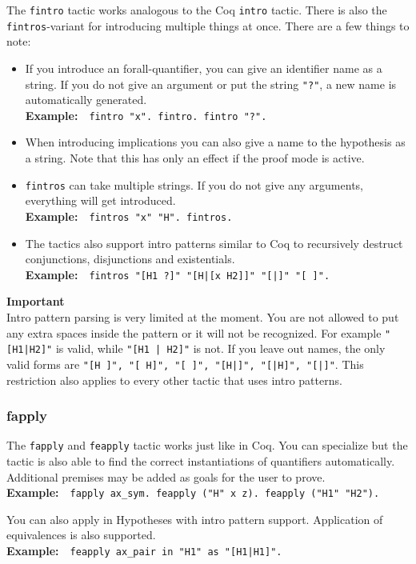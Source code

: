 \documentclass[12pt, a4paper]{article}
\newcommand{\coq}[1]{\texttt{#1}}
\newcommand{\important}[1]{
	\vspace{3pt}
	\begin{boximportant}
		\parbox{\textwidth}{\textcolor{colorimportant}{\textbf{Important}\\#1}}
	\end{boximportant}}
\newcommand{\example}[1]{\medskip\\\textbf{Example:}~~#1}
\begin{document}
The \texttt{fintro} tactic works analogous to the Coq \texttt{intro} tactic. 
There is also the \texttt{fintros}-variant for introducing multiple things at once. 
There are a few things to note:
\begin{itemize}
	\item 
	If you introduce an forall-quantifier, you can give an identifier name as a string. 
	If you do not give an argument or put the string \coq{"?"}, a new name is automatically generated.
	\example{\coq{fintro "x". fintro. fintro "?".}}
	
	\item
	When introducing implications you can also give a name to the hypothesis as a string. 
	Note that this has only an effect if the proof mode is active.
	
	\item 
	\texttt{fintros} can take multiple strings. 
	If you do not give any arguments, everything will get introduced.
	\example{\coq{fintros "x" "H". fintros.}}
	
	\item
	The tactics also support intro patterns similar to Coq to recursively destruct conjunctions, disjunctions and existentials.
	\example{\coq{fintros "[H1 ?]" "[H|[x H2]]" "[|]" "[ ]".}}
\end{itemize}
\label{todo-intro-pattern-parsing}\important{Intro pattern parsing is very limited at the moment. You are not allowed to put any extra spaces inside the pattern or it will not be recognized. For example \texttt{"[H1|H2]"} is valid, while \texttt{"[H1 | H2]"} is not. If you leave out names, the only valid forms are \texttt{"[H ]", "[ H]", "[ ]", "[H|]", "[|H]", "[|]"}. This restriction also applies to every other tactic that uses intro patterns.}



\subsubsection{\ttfamily fapply}

The \texttt{fapply} and \texttt{feapply} tactic works just like in Coq. 
You can specialize but the tactic is also able to find the correct instantiations of quantifiers automatically. Additional premises may be added as goals for the user to prove.
\example{\coq{fapply ax_sym. feapply ("H" x z). feapply ("H1" "H2").}}

\medskip\noindent
You can also apply in Hypotheses with intro pattern support. Application of equivalences is also supported.
\example{\coq{feapply ax_pair in "H1" as "[H1|H1]".}}
\end{document}
